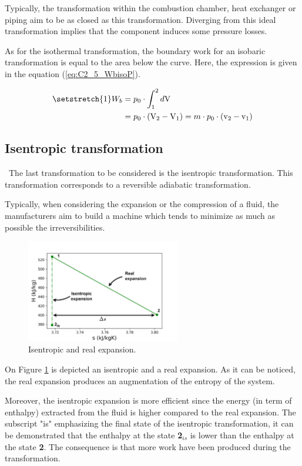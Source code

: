 Typically, the transformation within the combustion chamber, heat exchanger or piping aim to be as closed as this transformation. Diverging from this ideal transformation implies that the component induces some pressure losses.

As for the isothermal transformation, the boundary work for an isobaric transformation is equal to the area below the curve. Here, the expression is given in the equation (\ref{eq:C2_5_WbisoP}).

\begin{align}
  \setstretch{1}
  W_b &= p_0\cdot \int_1^2d\mathrm{V}\nonumber\\
   &= p_0\cdot (\mathrm{V_2} - \mathrm{V_1}) = m\cdot p_0\cdot (\mathrm{v_2} - \mathrm{v_1}) \label{eq:C2_5_WbisoP}
\end{align}\clearpage


\subsection{Isentropic transformation}
\quad\ The last transformation to be considered is the isentropic transformation. This transformation corresponds to a reversible adiabatic transformation. 

Typically, when considering the expansion or the compression of a fluid, the manufacturers aim to build a machine which tends to minimize as much as possible the irreversibilities. 

\begin{figure}[h]
  \centering
  \includegraphics[width=0.6\textwidth]{expansion.png}
  \caption{Isentropic and real expansion.}
  \label{fig:C2_5_expansion}
\end{figure}

On Figure \ref{fig:C2_5_expansion} is depicted an isentropic and a real expansion. As it can be noticed, the real expansion produces an augmentation of the entropy of the system. 

Moreover, the isentropic expansion is more efficient since the energy (in term of enthalpy) extracted from the fluid is higher compared to the real expansion. The subscript "is" emphasizing the final state of the isentropic transformation, it can be demonstrated that the enthalpy at the state \textbf{2$_{is}$} is lower than the enthalpy at the state \textbf{2}. The consequence is that more work have been produced during the transformation. 

